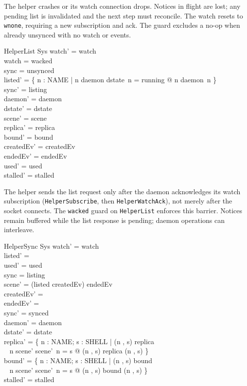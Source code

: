 \documentclass[a4paper,10pt,fleqn]{article}
\begin{document}
The helper crashes or its watch connection drops.  Notices in flight are
lost; any pending list is invalidated and the next step must reconcile.
The watch resets to \texttt{wnone}, requiring a new subscription and ack.
The guard excludes a no-op when already unsynced with no watch or events.

\begin{schema}{HelperList}
  \Delta Sys
\where
  watch' = watch \\
  watch = wacked \\
  sync = unsynced \\
  listed' = \{ n : NAME | n \in \dom daemon \land dstate~n = running
    @ n \mapsto daemon~n \} \\
  sync' = listing \\
  daemon' = daemon \\
  dstate' = dstate \\
  scene' = scene \\
  replica' = replica \\
  bound' = bound \\
  createdEv' = createdEv \\
  endedEv' = endedEv \\
  used' = used \\
  stalled' = stalled
\end{schema}

The helper sends the list request only after the daemon acknowledges its
watch subscription (\texttt{HelperSubscribe}, then \texttt{HelperWatchAck}),
not merely after the socket connects. The \texttt{wacked} guard on
\texttt{HelperList} enforces this barrier. Notices remain buffered
while the list response is pending; daemon operations can interleave.

\begin{schema}{HelperSync}
  \Delta Sys
\where
  watch' = watch \\
  listed' = \emptyset \\
  used' = used \\
  sync = listing \\
  scene' = (listed \cup createdEv) \setminus endedEv \\
  createdEv' = \emptyset \\
  endedEv' = \emptyset \\
  sync' = synced \\
  daemon' = daemon \\
  dstate' = dstate \\
  replica' = \{ n : NAME; s : SHELL | (n , s) \in \dom replica \\
    \quad~ \land n \in \dom scene' \land scene'~n = s @ (n , s) \mapsto replica (n , s) \} \\
  bound' = \{ n : NAME; s : SHELL | (n , s) \in \dom bound \\
    \quad~ \land n \in \dom scene' \land scene'~n = s @ (n , s) \mapsto bound (n , s) \} \\
  stalled' = stalled
\end{schema}
\end{document}

